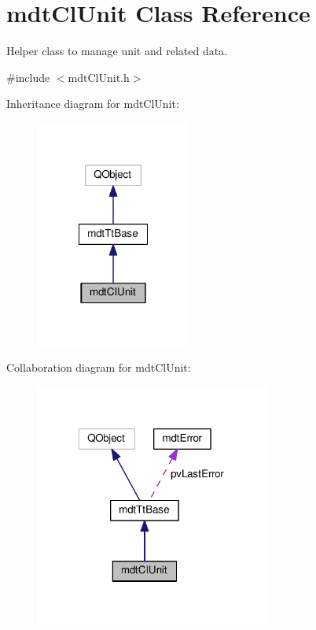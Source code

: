 \hypertarget{classmdt_cl_unit}{\section{mdt\-Cl\-Unit Class Reference}
\label{classmdt_cl_unit}
}


Helper class to manage unit and related data.  




{\ttfamily \#include $<$mdt\-Cl\-Unit.\-h$>$}



Inheritance diagram for mdt\-Cl\-Unit\-:\nopagebreak
\begin{figure}[H]
\begin{center}
\leavevmode
\includegraphics[width=144pt]{classmdt_cl_unit__inherit__graph}
\end{center}
\end{figure}


Collaboration diagram for mdt\-Cl\-Unit\-:\nopagebreak
\begin{figure}[H]
\begin{center}
\leavevmode
\includegraphics[width=218pt]{classmdt_cl_unit__coll__graph}
\end{center}
\end{figure}
